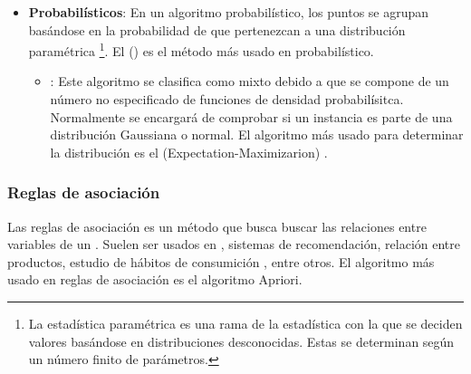 \begin{itemize}
  \item \textbf{Probabilísticos}: En un algoritmo probabilístico, los puntos se agrupan basándose en la probabilidad de que pertenezcan a una distribución paramétrica \footnote{La estadística paramétrica es una rama de la estadística con la que se deciden valores basándose en distribuciones desconocidas. Estas se determinan según un número finito de parámetros.}. El  () es el método más usado en  probabilístico.
        \begin{itemize}
          \item {}: Este algoritmo se clasifica como mixto debido a que se compone de un número no especificado de funciones de densidad probabilísitca. Normalmente se encargará de comprobar si un instancia es parte de una distribución Gaussiana o normal. El algoritmo más usado para determinar la distribución es el  (Expectation-Maximizarion) .
        \end{itemize}
\end{itemize}

\subsubsection{Reglas de asociación}

Las reglas de asociación es un método que busca buscar las relaciones entre variables de un . Suelen ser usados en , sistemas de recomendación, relación entre productos, estudio de hábitos de consumición , entre otros. El algoritmo más usado en reglas de asociación es el algoritmo Apriori.

